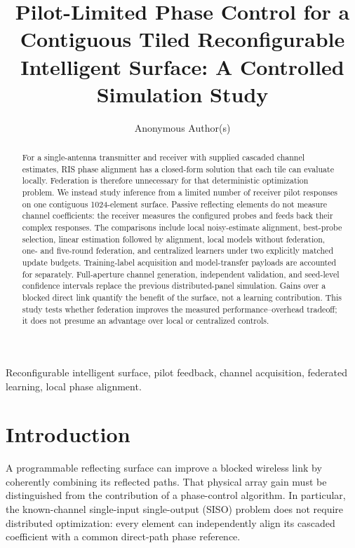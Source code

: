 \documentclass[journal]{IEEEtran}
\begin{document}
\title{Pilot-Limited Phase Control for a Contiguous Tiled Reconfigurable Intelligent Surface: A Controlled Simulation Study}
\author{Anonymous Author(s)}
\maketitle
\begin{abstract}
For a single-antenna transmitter and receiver with supplied cascaded channel estimates, RIS phase alignment has a closed-form solution that each tile can evaluate locally. Federation is therefore unnecessary for that deterministic optimization problem. We instead study inference from a limited number of receiver pilot responses on one contiguous 1024-element surface. Passive reflecting elements do not measure channel coefficients: the receiver measures the configured probes and feeds back their complex responses. The comparisons include local noisy-estimate alignment, best-probe selection, linear estimation followed by alignment, local models without federation, one- and five-round federation, and centralized learners under two explicitly matched update budgets. Training-label acquisition and model-transfer payloads are accounted for separately. Full-aperture channel generation, independent validation, and seed-level confidence intervals replace the previous distributed-panel simulation. Gains over a blocked direct link quantify the benefit of the surface, not a learning contribution. This study tests whether federation improves the measured performance--overhead tradeoff; it does not presume an advantage over local or centralized controls.
\end{abstract}
\begin{IEEEkeywords}
Reconfigurable intelligent surface, pilot feedback, channel acquisition, federated learning, local phase alignment.
\end{IEEEkeywords}

\section{Introduction}
A programmable reflecting surface can improve a blocked wireless link by coherently combining its reflected paths. That physical array gain must be distinguished from the contribution of a phase-control algorithm. In particular, the known-channel single-input single-output (SISO) problem does not require distributed optimization: every element can independently align its cascaded coefficient with a common direct-path phase reference.
\end{document}
